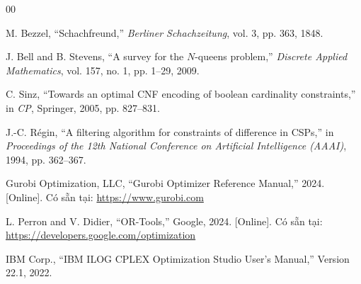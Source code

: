 \documentclass[a4paper,11pt]{article}
\begin{document}
\begin{thebibliography}{00}

M. Bezzel, ``Schachfreund,'' \emph{Berliner Schachzeitung}, vol. 3, pp. 363, 1848.

J. Bell and B. Stevens, ``A survey for the $N$-queens problem,'' \emph{Discrete Applied Mathematics}, vol. 157, no. 1, pp. 1--29, 2009.

C. Sinz, ``Towards an optimal CNF encoding of boolean cardinality constraints,'' in \emph{CP}, Springer, 2005, pp. 827--831.

J.-C. R\'{e}gin, ``A filtering algorithm for constraints of difference in CSPs,'' in \emph{Proceedings of the 12th National Conference on Artificial Intelligence (AAAI)}, 1994, pp. 362--367.

Gurobi Optimization, LLC, ``Gurobi Optimizer Reference Manual,'' 2024. [Online]. Có sẵn tại: \url{https://www.gurobi.com}

L. Perron and V. Didier, ``OR-Tools,'' Google, 2024. [Online]. Có sẵn tại: \url{https://developers.google.com/optimization}

IBM Corp., ``IBM ILOG CPLEX Optimization Studio User's Manual,'' Version 22.1, 2022.

\end{thebibliography}
\end{document}
